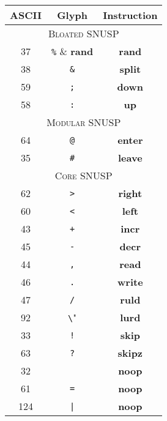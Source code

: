 \documentclass[a4paper]{article}
\begin{document}
\begin{center}\begin{tabular}{|ccc|}

\hline

\textsc{ASCII} & Glyph & Instruction \\

\hline \hline

\multicolumn{3}{|c|}{\textsc{Bloated SNUSP}} \\

37 & \verb"%" & \textbf{rand} \\

38 & \verb"&" & \textbf{split} \\

59 & \verb";" & \textbf{down} \\

58 & \verb":" & \textbf{up} \\

\hline

\multicolumn{3}{|c|}{\textsc{Modular SNUSP}} \\

64 & \verb"@" & \textbf{enter} \\

35 & \verb"#" & \textbf{leave} \\

\hline

\multicolumn{3}{|c|}{\textsc{Core SNUSP}} \\

62 & \verb">" & \textbf{right} \\

60 & \verb"<" & \textbf{left} \\

43 & \verb"+" & \textbf{incr} \\

45 & \verb"-" & \textbf{decr} \\

44 & \verb"," & \textbf{read} \\

46 & \verb"." & \textbf{write} \\

47 & \verb"/" & \textbf{ruld} \\

92 & \verb"\" & \textbf{lurd} \\

33 & \verb"!" & \textbf{skip} \\

63 & \verb"?" & \textbf{skipz} \\

\hline

32 & \verb" " & \textbf{noop} \\

61 & \verb"=" & \textbf{noop} \\

124 & \verb"|" & \textbf{noop} \\

\hline

\end{tabular}\end{center}
\end{document}
